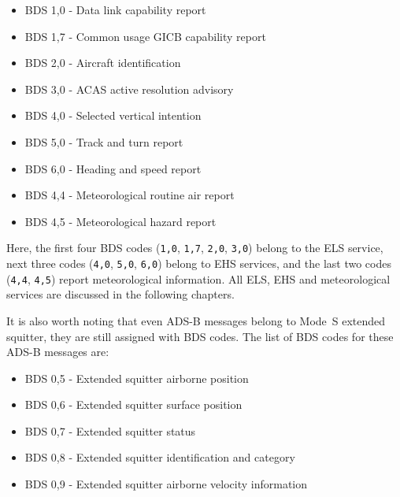 \begin{itemize}
  \item BDS 1,0 - Data link capability report
  \item BDS 1,7 - Common usage GICB capability report
  \item BDS 2,0 - Aircraft identification
  \item BDS 3,0 - ACAS active resolution advisory
  \item BDS 4,0 - Selected vertical intention
  \item BDS 5,0 - Track and turn report
  \item BDS 6,0 - Heading and speed report
  \item BDS 4,4 - Meteorological routine air report
  \item BDS 4,5 - Meteorological hazard report
\end{itemize}

Here, the first four BDS codes (\texttt{1,0}, \texttt{1,7}, \texttt{2,0}, \texttt{3,0}) belong to the ELS service, next three codes (\texttt{4,0}, \texttt{5,0}, \texttt{6,0}) belong to EHS services, and the last two codes (\texttt{4,4}, \texttt{4,5}) report meteorological information. All ELS, EHS and meteorological services are discussed in the following chapters.

It is also worth noting that even ADS-B messages belong to Mode~S extended squitter, they are still assigned with BDS codes. The list of BDS codes for these ADS-B messages are:

\begin{itemize}
  \item BDS 0,5 - Extended squitter airborne position
  \item BDS 0,6 - Extended squitter surface position
  \item BDS 0,7 - Extended squitter status
  \item BDS 0,8 - Extended squitter identification and category
  \item BDS 0,9 - Extended squitter airborne velocity information
\end{itemize}